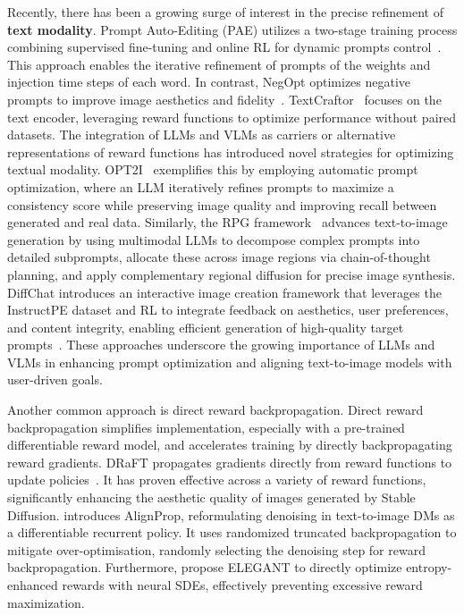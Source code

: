 Recently, there has been a growing surge of interest in the precise refinement of \textbf{text modality}. Prompt Auto-Editing (PAE) utilizes a two-stage training process combining supervised fine-tuning and online RL for dynamic prompts control~\citep{mo2024dynamic}. This approach enables the iterative refinement of prompts of the weights and injection time steps of each word. In contrast, NegOpt optimizes negative prompts to improve image aesthetics and fidelity~\citep{ogezi2024optimizing}. 
TextCraftor~\citep{li2024textcraftor} focuses on the text encoder, leveraging reward functions to optimize performance without paired datasets. 
The integration of LLMs and VLMs as carriers or alternative representations of reward functions has introduced novel strategies for optimizing textual modality. OPT2I~\citep{manas2024improving} exemplifies this by employing automatic prompt optimization, where an LLM iteratively refines prompts to maximize a consistency score while preserving image quality and improving recall between generated and real data. Similarly, the RPG framework~\citep{yang2024mastering} advances text-to-image generation by using multimodal LLMs to decompose complex prompts into detailed subprompts, allocate these across image regions via chain-of-thought planning, and apply complementary regional diffusion for precise image synthesis.
DiffChat introduces an interactive image creation framework that leverages the InstructPE dataset and RL to integrate feedback on aesthetics, user preferences, and content integrity, enabling efficient generation of high-quality target prompts~\citep{wang2024diffchat}. These approaches underscore the growing importance of LLMs and VLMs in enhancing prompt optimization and aligning text-to-image models with user-driven goals.

Another common approach is direct reward backpropagation. Direct reward backpropagation simplifies implementation, especially with a pre-trained differentiable reward model, and accelerates training by directly backpropagating reward gradients. DRaFT propagates gradients directly from reward functions to update policies~\citep{clark2023directly}. It has proven effective across a variety of reward functions, significantly enhancing the aesthetic quality of images generated by Stable Diffusion.  \citet{prabhudesai2024aligningtexttoimagediffusionmodels} introduces AlignProp, reformulating denoising in text-to-image DMs as a differentiable recurrent policy. It uses randomized truncated backpropagation to mitigate over-optimisation, randomly selecting the denoising step for reward backpropagation.
Furthermore, \citet{uehara2024finetuningcontinuoustimediffusionmodels} propose ELEGANT to directly optimize entropy-enhanced rewards with neural SDEs, effectively preventing excessive reward maximization.

